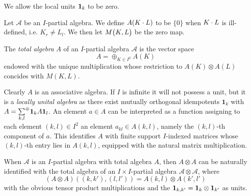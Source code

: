 \begin{Rem}We allow the local units $\mathbf{1}_k$ to be zero. %
\end{Rem}

Let $\mathscr{A}$ be an $I$-partial algebra. We define $A(K\cdot L)$ to be $\{0\}$ when $K\cdot L$ is ill-defined, i.e. $K_r\neq L_l$. We then let $M{\begin{pmatrix} K, L\end{pmatrix}}$ be the zero map.

\begin{Def} The \emph{total algebra} $A$ of an $I$-partial algebra $\mathscr{A}$ is the vector space \[A = \oplus_{K\in I^2} A(K)\] endowed with the unique multiplication whose restriction to $A(K)\otimes A(L)$ concides with $M(K,L)$.  
\end{Def} 
Clearly $A$ is an associative algebra. If $I$ is infinite it will not possess a unit, but it is a \emph{locally unital algebra} as there exist mutually orthogonal idempotents $\mathbf{1}_k$ with $A = \underset{k,l}{\sum}^{\oplus} \mathbf{1}_kA\mathbf{1}_l$. An element $a\in A$ can be interpreted as a function assigning to each element $(k,l)\in I^2$ an element $a_{kl}\in A(k,l)$, namely the $(k,l)$-th component of $a$. This identifies $A$ with finite support $I$-indexed matrices whose $(k,l)$-th entry lies in $A(k,l)$, equipped with the natural matrix multiplication. 

\begin{Rem}\label{RemGrad} When $\mathscr{A}$ is an $I$-partial algebra with total algebra $A$, then $A\otimes A$ can be naturally identified with the total algebra of an $I\times I$-partial algebra $\mathscr{A}\otimes \mathscr{A}$, where \[(A\otimes A)((k,k'),(l,l')) = A(k,l)\otimes A(k',l')\] with the obvious tensor product multiplications and the $\mathbf{1}_{k,k'} = \mathbf{1}_k\otimes \mathbf{1}_{k'}$ as units. 
\end{Rem} 


